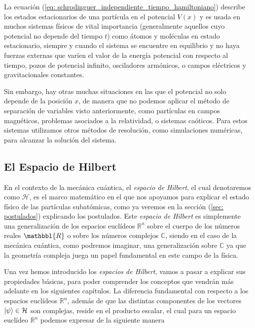 \documentclass{article}
\numberwithin{equation}{section} %
\begin{document}
    \vspace{5mm}

    La ecuación (\ref{eq: schrodinguer_independiente_tiempo_hamiltoniano}) describe los estados estacionarios de una partícula en el potencial \( V(x) \) y es usada en muchos sistemas físicos de vital importancia (generalmente aquellos cuyo potencial no depende del tiempo \( t \)) como átomos y moléculas en estado estacionario, siempre y cuando el sistema se encuentre en equilibrio y no haya fuerzas externas que varíen el valor de la energía potencial con respecto al tiempo, pozos de potencial infinito, osciladores armónicos, o campos eléctricos y gravitacionales constantes.

    \vspace{5mm}

    Sin embargo, hay otras muchas situaciones en las que el potencial no solo depende de la posición \( x \), de manera que no podemos aplicar el método de separación de variables visto anteriormente, como partículas en campos magnéticos, problemas asociados a la relatividad, o sistemas caóticos. Para estos sistemas utilizamos otros métodos de resolución, como simulaciones numéricas, para alcanzar la solución del sistema.

    \vspace{5mm}

    \subsection{El Espacio de Hilbert}

    \vspace{5mm}

    En el contexto de la mecánica cuántica, el \textit{espacio de Hilbert}, el cual denotaremos como \( \mathcal{H} \), es el marco matemático en el que nos apoyamos para explicar el estado físico de las partículas subatómicas, como ya veremos en la sección (\ref{sec: postulados}) explicando los postulados. Este \textit{espacio de Hilbert} es simplemente una generalización de los espacios euclídeos \( \mathbb{R}^{n} \) sobre el cuerpo de los números reales \( \mathbbl{R} \) o sobre los números complejos \( \mathbb{C} \), siendo en el caso de la mecánica cuántica, como podremos imaginar, una generalización sobre \( \mathbb{C} \) ya que la geometría compleja juega un papel fundamental en este campo de la física.
    
    \vspace{5mm}

    Una vez hemos introducido los \textit{espacios de Hilbert}, vamos a pasar a explicar sus propiedades básicas, para poder comprender los conceptos que vendrán más adelante en los siguientes capítulos. La diferencia fundamental con respecto a los espacios euclídeos \( \mathbb{R}^{n} \), además de que las distintas componentes de los vectores \( \ket{\psi} \in \mathcal{H} \) son complejas, reside en el producto escalar, el cual para un espacio euclídeo \( \mathbb{R}^{n} \) podemos expresar de la siguiente manera
\end{document}
